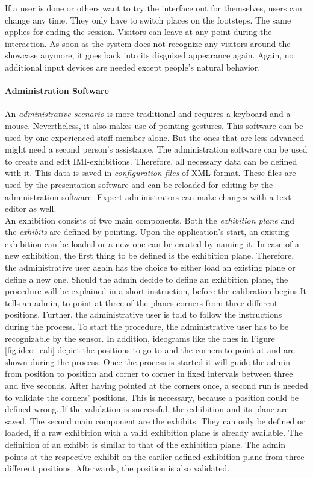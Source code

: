 If a user is done or others want to try the interface out for themselves, users can change any time. They only have to switch places on the footsteps. The same applies for ending the session. Visitors can leave at any point during the interaction. As soon as the system does not recognize any visitors around the showcase anymore, it goes back into its disguised appearance again. Again, no additional input devices are needed except people's natural behavior.

\paragraph{Administration Software} An \textit{administrative scenario} is more traditional and requires a keyboard and a mouse. Nevertheless, it also makes use of pointing gestures. This software can be used by one experienced staff member alone. But the ones that are less advanced might need a second person's assistance. The administration software can be used to create and edit \ac{IMI}-exhibitions. Therefore, all necessary data can be defined with it. This data is saved in \textit{configuration files} of XML-format. These files are used by the presentation software and can be reloaded for editing by the administration software. Expert administrators can make changes with a text editor as well. 
\\
An exhibition consists of two main components. Both the \textit{exhibition plane} and the \textit{exhibits} are defined by pointing. Upon the application's start, an existing exhibition can be loaded or a new one can be created by naming it. In case of a new exhibition, the first thing to be defined is the exhibition plane. Therefore, the administrative user again has the choice to either load an existing plane or define a new one. Should the admin decide to define an exhibition plane, the procedure will be explained in a short instruction, before the calibration begins.It tells an admin, to point at three of the planes corners from three different positions. Further, the administrative user is told to follow the instructions during the process. To start the procedure, the administrative user has to be recognizable by the sensor. In addition, ideograms like the ones in Figure \ref{fig:ideo_cali} depict the positions to go to and the corners to point at and are shown during the process. Once the process is started it will guide the admin from position to position and corner to corner in fixed intervals between three and five seconds. After having pointed at the corners once, a second run is needed to validate the corners' positions. This is necessary, because a position could be defined wrong. If the validation is successful, the exhibition and its plane are saved. The second main component are the exhibits. They can only be defined or loaded, if a raw exhibition with a valid exhibition plane is already available. The definition of an exhibit is similar to that of the exhibition plane. The admin points at the respective exhibit on the earlier defined exhibition plane from three different positions. Afterwards, the position is also validated.
